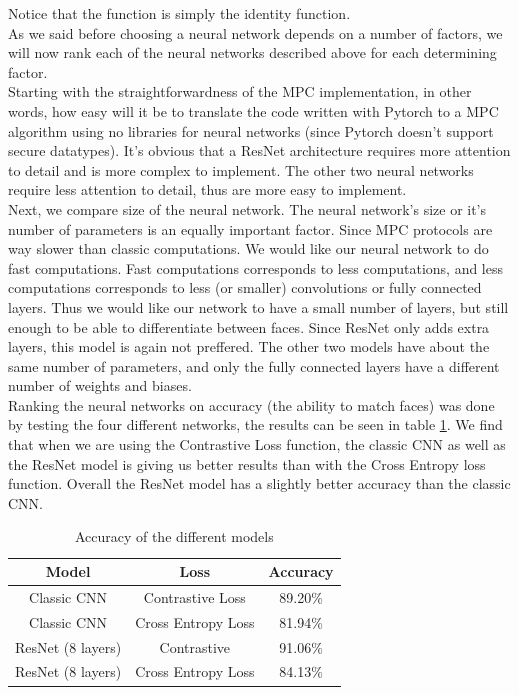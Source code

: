 Notice that the  function is simply the identity function.\\

As we said before choosing a neural network depends on a number of factors, we will now rank each of the neural networks described above for each determining factor.\\

Starting with the straightforwardness of the MPC implementation, in other words, how easy will it be to translate the code written with Pytorch to a MPC algorithm using no libraries for neural networks (since Pytorch doesn't support secure datatypes). It's obvious that a ResNet architecture requires more attention to detail and is more complex to implement. The other two neural networks require less attention to detail, thus are more easy to implement.\\

Next, we compare size of the neural network. The neural network's size or it's number of parameters is an equally important factor. Since MPC protocols are way slower than classic computations. We would like our neural network to do fast computations. Fast computations corresponds to less computations, and less computations corresponds to less (or smaller) convolutions or fully connected layers. Thus we would like our network to have a small number of layers, but still enough to be able to differentiate between faces. Since ResNet only adds extra layers, this model is again not preffered. The other two models have about the same number of parameters, and only the fully connected layers have a different number of weights and biases.\\

Ranking the neural networks on accuracy (the ability to match faces) was done by testing the four different networks, the results can be seen in table \ref{table:designaccuracy}. We find that when we are using the Contrastive Loss function, the classic CNN as well as the ResNet model is giving us better results than with the Cross Entropy loss function. Overall the ResNet model has a slightly better accuracy than the classic CNN.


\begin{table}[H]
\centering
\begin{tabular}{||c c c||}
 \hline
 Model & Loss & Accuracy \\ [0.5ex]
 \hline\hline
 Classic CNN  & Contrastive Loss & 89.20\% \\
 Classic CNN  & Cross Entropy Loss & 81.94\% \\
 ResNet (8 layers)  & Contrastive & 91.06\% \\
 ResNet (8 layers)  & Cross Entropy Loss & 84.13\% \\
 \hline
\end{tabular}
\caption{Accuracy of the different models}
\label{table:designaccuracy}
\end{table}

